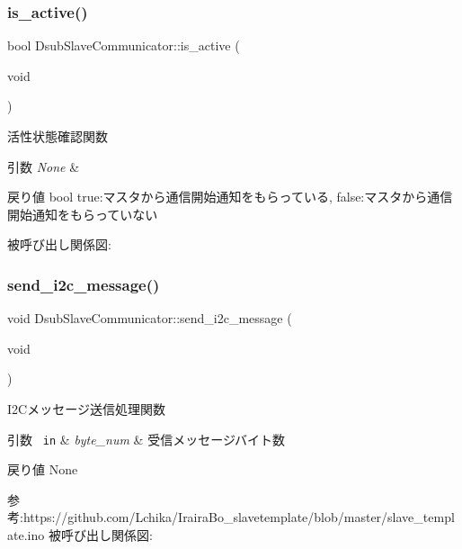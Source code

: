 \subsubsection{\texorpdfstring{is\_active()}{is\_active()}}
{\footnotesize\ttfamily bool Dsub\+Slave\+Communicator\+::is\+\_\+active (\begin{DoxyParamCaption}\item[{void}]{ }\end{DoxyParamCaption})\hspace{0.3cm}{\ttfamily [static]}}



活性状態確認関数 


\begin{DoxyParams}{引数}
{\em None} & \\
\hline
\end{DoxyParams}
\begin{DoxyReturn}{戻り値}
bool true\+:マスタから通信開始通知をもらっている, false\+:マスタから通信開始通知をもらっていない 
\end{DoxyReturn}
被呼び出し関係図\+:
\mbox{\label{class_dsub_slave_communicator_a0a49728ad2bec47e0cb6e6ee93f0182b}} 
\subsubsection{\texorpdfstring{send\_i2c\_message()}{send\_i2c\_message()}}
{\footnotesize\ttfamily void Dsub\+Slave\+Communicator\+::send\+\_\+i2c\+\_\+message (\begin{DoxyParamCaption}\item[{void}]{ }\end{DoxyParamCaption})\hspace{0.3cm}{\ttfamily [static]}}



I2\+Cメッセージ送信処理関数 


\begin{DoxyParams}[1]{引数}
\mbox{\texttt{ in}}  & {\em byte\+\_\+num} & 受信メッセージバイト数 \\
\hline
\end{DoxyParams}
\begin{DoxyReturn}{戻り値}
None
\end{DoxyReturn}
参考\+:https\+://github.com/\+Lchika/\+Iraira\+Bo\+\_\+slavetemplate/blob/master/slave\+\_\+template.\+ino 被呼び出し関係図\+:
\mbox{\label{class_dsub_slave_communicator_a38614c9732f810200a8429dd4bac88aa}} 
